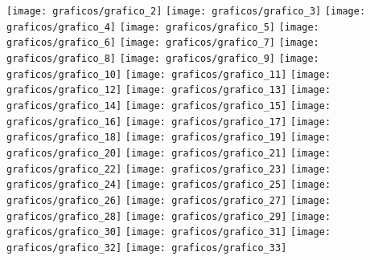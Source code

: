 \documentclass[10pt,oneside,a4paper]{article}
\begin{document}
\noindent
\texttt{[image: graficos/grafico\_2]}
\texttt{[image: graficos/grafico\_3]}
\texttt{[image: graficos/grafico\_4]}
\texttt{[image: graficos/grafico\_5]}
\texttt{[image: graficos/grafico\_6]}
\texttt{[image: graficos/grafico\_7]}
\texttt{[image: graficos/grafico\_8]}
\texttt{[image: graficos/grafico\_9]}
\texttt{[image: graficos/grafico\_10]}
\texttt{[image: graficos/grafico\_11]}
\texttt{[image: graficos/grafico\_12]}
\texttt{[image: graficos/grafico\_13]}
\texttt{[image: graficos/grafico\_14]}
\texttt{[image: graficos/grafico\_15]}
\texttt{[image: graficos/grafico\_16]}
\texttt{[image: graficos/grafico\_17]}
\texttt{[image: graficos/grafico\_18]}
\texttt{[image: graficos/grafico\_19]}
\texttt{[image: graficos/grafico\_20]}
\texttt{[image: graficos/grafico\_21]}
\texttt{[image: graficos/grafico\_22]}
\texttt{[image: graficos/grafico\_23]}
\texttt{[image: graficos/grafico\_24]}
\texttt{[image: graficos/grafico\_25]}
\texttt{[image: graficos/grafico\_26]}
\texttt{[image: graficos/grafico\_27]}
\texttt{[image: graficos/grafico\_28]}
\texttt{[image: graficos/grafico\_29]}
\texttt{[image: graficos/grafico\_30]}
\texttt{[image: graficos/grafico\_31]}
\texttt{[image: graficos/grafico\_32]}
\texttt{[image: graficos/grafico\_33]}
\end{document}
